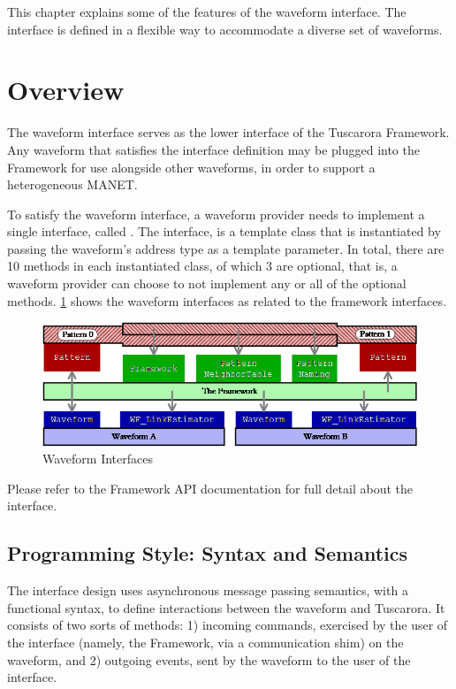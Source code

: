 
This chapter explains some of the features of the waveform interface. The interface is defined in a flexible way to accommodate a diverse set of waveforms. 

\section{Overview}

The waveform interface serves as the lower interface of the Tuscarora Framework.  Any waveform that satisfies the interface definition may be plugged into the Framework for use alongside other waveforms, in order to support a heterogeneous MANET.

To satisfy the waveform interface, a waveform provider needs to implement a single interface, called .  The interface,  is a template class that is instantiated by passing the waveform’s address type as a template parameter.  In total, there are 10 methods in each instantiated class, of which 3 are optional, that is, a waveform provider can choose to not implement any or all of the optional methods. \cref{Fig:WaveformModules} shows the waveform
interfaces as related to the framework interfaces.


\begin{figure}[h]
 \centering
 \includegraphics[width=0.9\linewidth]{figures/WaveformModules}
 \caption{Waveform Interfaces}
 \label{Fig:WaveformModules}
\end{figure}

Please refer to the Framework API documentation for full detail about the  interface. 


\subsection {Programming Style:  Syntax and Semantics}
The interface design uses asynchronous message passing semantics, with a functional syntax, to define interactions between the waveform and Tuscarora.  It consists of two sorts of methods:  1) incoming commands, exercised by the user of the interface (namely, the Framework, via a communication shim) on the waveform, and 2) outgoing events, sent by the waveform to the user of the interface.

